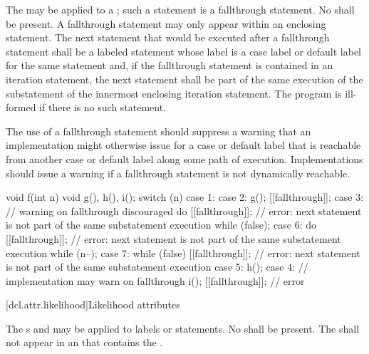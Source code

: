 \pnum
The  
may be applied to a ;
such a statement is a fallthrough statement.
No  shall be present.
A fallthrough statement may only appear within
an enclosing  statement.
The next statement that would be executed after a fallthrough statement
shall be a labeled statement whose label is a case label or
default label for the same  statement and,
if the fallthrough statement is contained in an iteration statement,
the next statement shall be part of the same execution of
the substatement of the innermost enclosing iteration statement.
The program is ill-formed if there is no such statement.

\pnum
\recommended
The use of a fallthrough statement should suppress
a warning that an implementation might otherwise issue
for a case or default label that is reachable
from another case or default label along some path of execution.
Implementations should issue a warning
if a fallthrough statement is not dynamically reachable.

\pnum
\begin{example}
\begin{codeblock}
void f(int n) {
  void g(), h(), i();
  switch (n) {
  case 1:
  case 2:
    g();
    [[fallthrough]];
  case 3:                       // warning on fallthrough discouraged
    do {
      [[fallthrough]];          // error: next statement is not part of the same substatement execution
    } while (false);
  case 6:
    do {
      [[fallthrough]];          // error: next statement is not part of the same substatement execution
    } while (n--);
  case 7:
    while (false) {
      [[fallthrough]];          // error: next statement is not part of the same substatement execution
    }
  case 5:
    h();
  case 4:                       // implementation may warn on fallthrough
    i();
    [[fallthrough]];            // error
  }
}
\end{codeblock}
\end{example}

[dcl.attr.likelihood]{Likelihood attributes}%

\pnum
The s
 and 
may be applied to labels or statements.
No  shall be present.
The  
shall not appear in an 
that contains the  .

